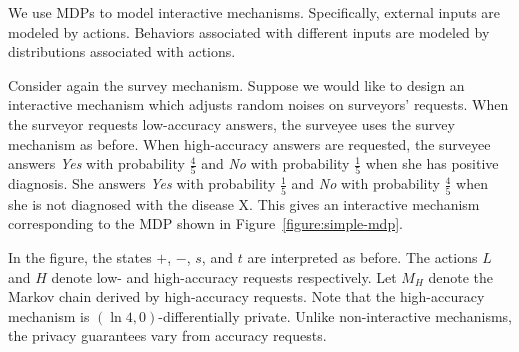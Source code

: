 We use MDPs to model 
interactive mechanisms. Specifically, external inputs are modeled by
actions. Behaviors associated with different inputs are modeled by
distributions associated with actions.


Consider again the survey mechanism. Suppose we would like to design
an interactive mechanism which adjusts random noises on surveyors'
requests. When the surveyor requests low-accuracy answers, the
surveyee uses the survey mechanism as before. When high-accuracy
answers are requested, the surveyee answers \textit{Yes} with
probability $\frac{4}{5}$ and \textit{No} with probability $\frac{1}{5}$ when she has
positive diagnosis. She answers \textit{Yes} with probability $\frac{1}{5}$
and \textit{No} with probability $\frac{4}{5}$ when she is not
diagnosed with the disease X. This gives an interactive mechanism
corresponding to the MDP shown in
Figure~\ref{figure:simple-mdp}.

In the figure, the states $+$,
$-$, $s$, and $t$ are interpreted as before. The actions $L$ and $H$
denote low- and high-accuracy requests respectively. Let $M_H$ denote
the Markov chain derived by high-accuracy requests.
Note that the high-accuracy mechanism is $(\ln 4,0)$-differentially private.
Unlike non-interactive mechanisms, the privacy guarantees vary from accuracy requests.
